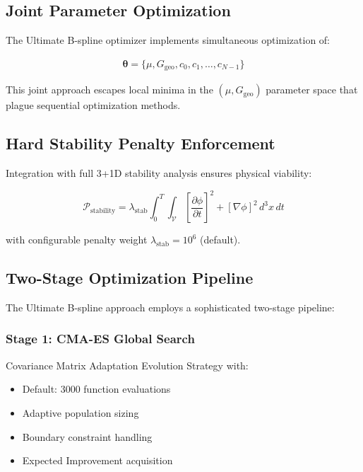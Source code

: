\documentclass[12pt,a4paper]{article}
\begin{document}
\subsection{Joint Parameter Optimization}

The Ultimate B-spline optimizer implements simultaneous optimization of:

\begin{align}
\boldsymbol{\theta} = \{\mu, G_{\text{geo}}, c_0, c_1, \ldots, c_{N-1}\}
\end{align}

This joint approach escapes local minima in the $(\mu, G_{\text{geo}})$ parameter space that plague sequential optimization methods.

\subsection{Hard Stability Penalty Enforcement}

Integration with full 3+1D stability analysis ensures physical viability:

\begin{equation}
\mathcal{P}_{\text{stability}} = \lambda_{\text{stab}} \int_0^T \int_{\mathcal{V}} \left[\frac{\partial \phi}{\partial t}\right]^2 + \left[\nabla \phi\right]^2 \, d^3x \, dt
\end{equation}

with configurable penalty weight $\lambda_{\text{stab}} = 10^6$ (default).

\subsection{Two-Stage Optimization Pipeline}

The Ultimate B-spline approach employs a sophisticated two-stage pipeline:

\subsubsection{Stage 1: CMA-ES Global Search}
Covariance Matrix Adaptation Evolution Strategy with:
\begin{itemize}
\item Default: 3000 function evaluations
\item Adaptive population sizing
\item Boundary constraint handling
\item Expected Improvement acquisition
\end{itemize}
\end{document}
